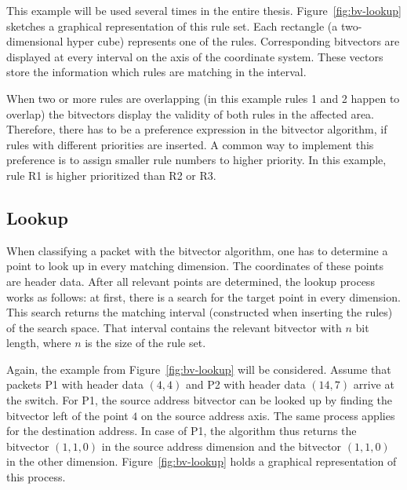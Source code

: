 \documentclass[conference]{IEEEtran}
\begin{document}
This example will be used several times in the entire thesis.
Figure~\ref{fig:bv-lookup} sketches a graphical representation of this rule set.
Each rectangle (a two-dimensional hyper cube) represents one of the rules.
Corresponding bitvectors are displayed at every interval on the axis of the coordinate system.
These vectors store the information which rules are matching in the interval.

When two or more rules are overlapping (in this example rules 1 and 2 happen 
to overlap) the bitvectors display the validity of both rules in the affected area.
Therefore, there has to be a preference expression in the bitvector algorithm, 
if rules with different priorities are inserted.
A common way to implement this preference is to assign smaller rule numbers to higher priority.
In this example, rule R1 is higher prioritized than R2 or R3.

\subsection{Lookup}
When classifying a packet with the bitvector algorithm, one has to determine a point to look up in every matching dimension.
The coordinates of these points are header data.
After all relevant points are determined, the lookup process works as follows:
at first, there is a search for the target point in every dimension.
This search returns the matching interval (constructed when inserting the rules) of the search space.
That interval contains the relevant bitvector with $n$ bit length, where $n$ is the size of the rule set.

Again, the example from Figure~\ref{fig:bv-lookup} will be considered.
Assume that packets P1 with header data $(4, 4)$ and P2 with header data $(14, 7)$ arrive at the switch.
For P1, the source address bitvector can be looked up by finding the
bitvector left of the point $4$ on the source address axis.
The same process applies for the destination address.
In case of P1, the algorithm thus returns the bitvector $(1, 1, 0)$ in the 
source address dimension and the bitvector $(1, 1, 0)$ in the other dimension.
Figure~\ref{fig:bv-lookup} holds a graphical representation of this process.
\end{document}
